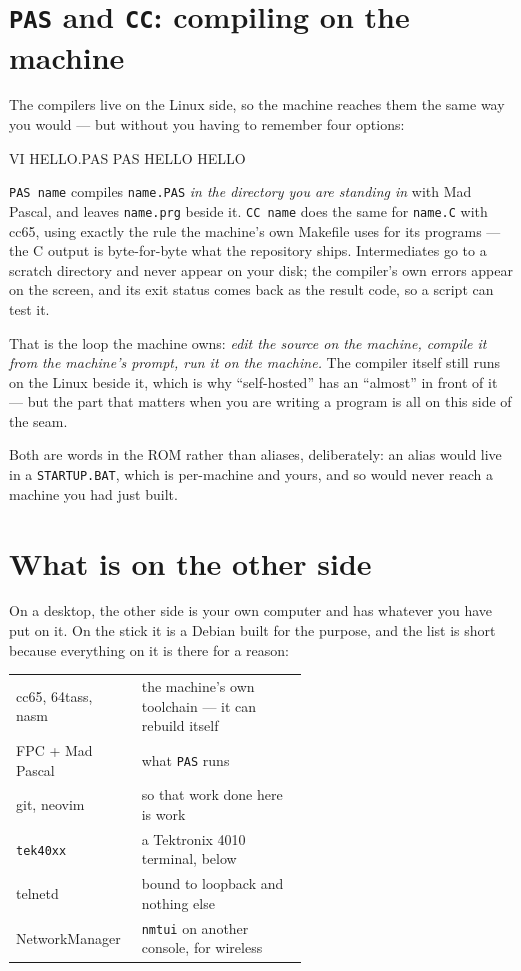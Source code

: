 \section{\texttt{PAS} and \texttt{CC}: compiling on the machine}
The compilers live on the Linux side, so the machine reaches them the
same way you would --- but without you having to remember four options:

\begin{type}
VI HELLO.PAS
PAS HELLO
HELLO
\end{type}

\verb|PAS name| compiles \texttt{name.PAS} \emph{in the directory you are
standing in} with Mad Pascal, and leaves \texttt{name.prg} beside it.
\verb|CC name| does the same for \texttt{name.C} with cc65, using exactly
the rule the machine's own Makefile uses for its programs --- the C output
is byte-for-byte what the repository ships. Intermediates go to a scratch
directory and never appear on your disk; the compiler's own errors appear
on the screen, and its exit status comes back as the result code, so a
script can test it.

That is the loop the machine owns: \emph{edit the source on the machine,
compile it from the machine's prompt, run it on the machine.} The
compiler itself still runs on the Linux beside it, which is why
``self-hosted'' has an ``almost'' in front of it --- but the part that
matters when you are writing a program is all on this side of the seam.

Both are words in the ROM rather than aliases, deliberately: an alias
would live in a \texttt{STARTUP.BAT}, which is per-machine and yours, and
so would never reach a machine you had just built.

\section{What is on the other side}
On a desktop, the other side is your own computer and has whatever you
have put on it. On the stick it is a Debian built for the purpose, and
the list is short because everything on it is there for a reason:

\begin{center}
\small
\begin{tabular}{@{}l >{\raggedright\arraybackslash}p{0.58\linewidth}@{}}
\toprule
cc65, 64tass, nasm & the machine's own toolchain --- it can rebuild itself \\
FPC + Mad Pascal & what \verb|PAS| runs \\
git, neovim & so that work done here is work \\
\texttt{tek40xx} & a Tektronix 4010 terminal, below \\
telnetd & bound to loopback and nothing else \\
NetworkManager & \texttt{nmtui} on another console, for wireless \\
\bottomrule
\end{tabular}
\end{center}

